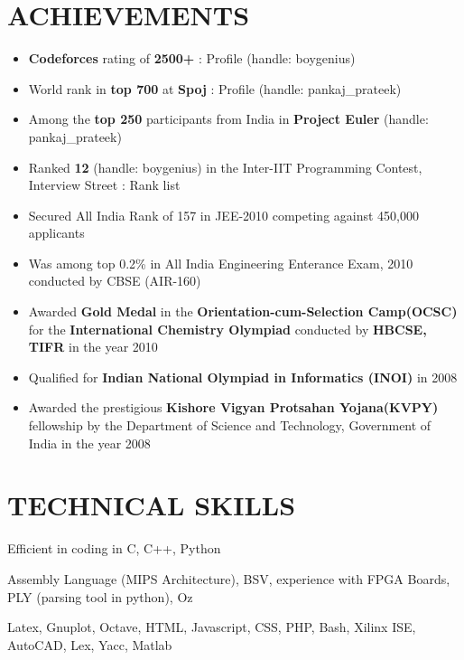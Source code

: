 \documentclass{article}
\begin{document}
\section*{ACHIEVEMENTS}
\begin{itemize}
\item {\bf Codeforces} rating of {\bf 2500+} : Profile (handle: boygenius)
\item World rank in {\bf top 700} at {\bf Spoj} : Profile (handle: pankaj\_prateek)
\item Among the {\bf top 250} participants from India in {\bf Project Euler} (handle: pankaj\_prateek)
\item Ranked {\bf 12} (handle: boygenius) in the Inter-IIT Programming Contest, Interview Street : Rank list
\item Secured All India Rank of 157 in JEE-2010 competing against 450,000 applicants
\item Was among top 0.2\% in All India Engineering Enterance Exam, 2010 conducted by CBSE (AIR-160)
\item Awarded {\bf Gold Medal} in the {\bf Orientation-cum-Selection Camp(OCSC)} for the {\bf International Chemistry Olympiad} conducted by {\bf HBCSE, TIFR} in the year 2010
\item Qualified for {\bf Indian National Olympiad in Informatics (INOI)} in 2008
\item Awarded the prestigious {\bf Kishore Vigyan Protsahan Yojana(KVPY)} fellowship by the Department of Science and Technology, Government of India in the year 2008
\end{itemize}

\section*{TECHNICAL SKILLS}
\begin{list}{-}{}
\item Efficient in coding in C, C++, Python
\item Assembly Language (MIPS Architecture), BSV, experience with FPGA Boards, PLY (parsing tool in python), Oz
\item Latex, Gnuplot, Octave, HTML, Javascript, CSS, PHP, Bash, Xilinx ISE, AutoCAD, Lex, Yacc, Matlab
\end{list}
\end{document}
